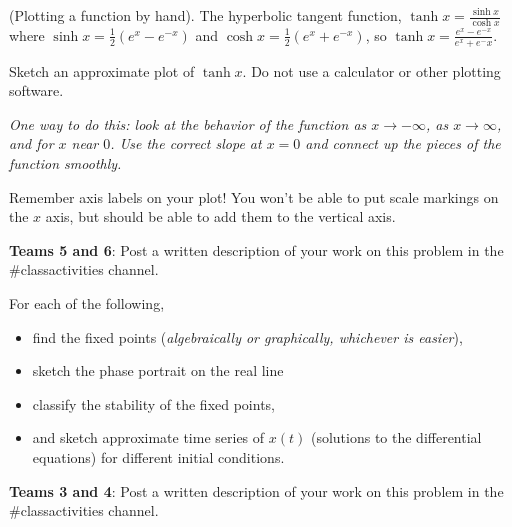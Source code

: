 \documentclass[12pt,letterpaper,noanswers]{exam}
\begin{document}
\begin{questions}
\question (Plotting a function by hand). The hyperbolic tangent function, $\tanh x = \frac{\sinh x}{\cosh x}$ where $\sinh x = \frac{1}{2}\left(e^{x}-e^{-x}\right)$ and $\cosh x = \frac{1}{2}\left(e^{x}+e^{-x}\right)$, so $\tanh x = \frac{e^x-e^{-x}}{e^x+e^-x}$.

Sketch an approximate plot of $\tanh x$.  Do not use a calculator or other plotting software.

\emph{One way to do this: look at the behavior of the function as $x \rightarrow -\infty$, as $x\rightarrow \infty$, and for $x$ near $0$.  Use the correct slope at $x=0$ and connect up the pieces of the function smoothly.}

Remember axis labels on your plot!  You won't be able to put scale markings on the $x$ axis, but should be able to add them to the vertical axis.

\noindent \textbf{Teams 5 and 6}: Post a written description of your work on this problem in the \#classactivities channel. 


\question

For each of the following, 
\begin{itemize}
\item find the fixed points ({\it{algebraically or graphically, whichever is easier}}), 
\item sketch the phase portrait on the real line
\item classify the stability of the fixed points, 
\item and sketch
approximate time series of $x(t)$ (solutions to the differential equations) for different initial conditions.
\end{itemize}

\noindent \textbf{Teams 3 and 4}: Post a written description of your work on this problem in the \#classactivities channel. 

\end{questions}
\end{document}
